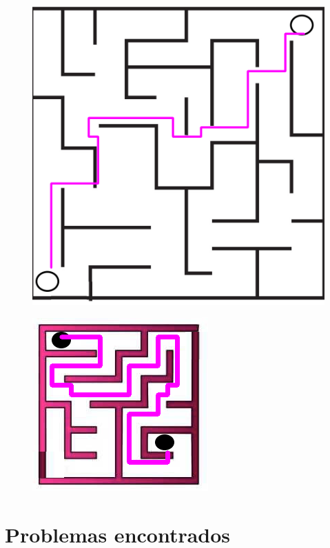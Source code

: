 \documentclass[conference]{IEEEtran}
\begin{document}
\begin{figure}[h!]
   \centering
    {\includegraphics[scale=0.15]{solutionhard.png}
    \label{fig:solutionhard}
    \caption{}
    }
\end{figure}
\begin{figure}[h!]
   \centering
    \includegraphics[scale=0.5]{solutionlab3.png}
    \label{fig:solutionlab3}
    \caption{}

\end{figure}

\section{Problemas encontrados}
\end{document}

